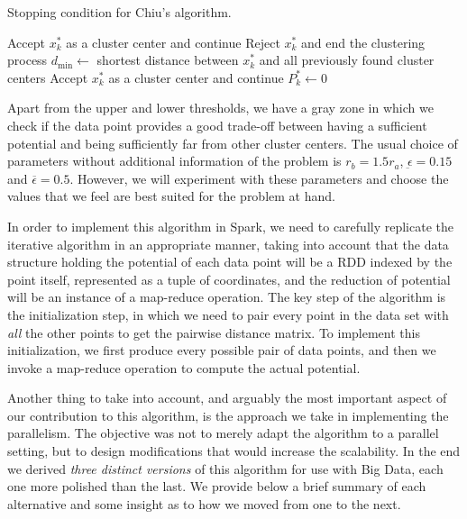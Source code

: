 \begin{algorithm}
  \caption{Stopping condition for Chiu's algorithm.}
    \label{alg:chiu1}
  \begin{algorithmic}
      \State Accept $x_k^\ast$ as a cluster center and continue
      \State Reject $x_k^\ast$ and end the clustering process
    \Else
      \State $d_{\text{min}}\gets$ shortest distance between $x_k^\ast$ and all previously found cluster centers
        \State Accept $x_k^\ast$ as a cluster center and continue
      \Else
        \State$P_k^\ast \gets 0$
      \EndIf
  \EndIf
  \end{algorithmic}
\end{algorithm}


Apart from the upper and lower thresholds, we have a gray zone in which we check if the data point provides a good trade-off between having a sufficient potential and being sufficiently far from other cluster centers. The usual choice of parameters without additional information of the problem is $r_b=1.5r_a$, $\underbar{\epsilon}=0.15$ and $\overbar{\epsilon}=0.5$. However, we will experiment with these parameters and choose the values that we feel are best suited for the problem at hand.

In order to implement this algorithm in Spark, we need to carefully replicate the iterative algorithm in an appropriate manner, taking into account that the data structure holding the potential of each data point will be a RDD indexed by the point itself, represented as a tuple of coordinates, and the reduction of potential will be an instance of a map-reduce operation. The key step of the algorithm is the initialization step, in which we need to pair every point in the data set with \textit{all} the other points to get the pairwise distance matrix. To implement this initialization, we first produce every possible pair of data points, and then we invoke a map-reduce operation to compute the actual potential.

Another thing to take into account, and arguably the most important aspect of our contribution to this algorithm, is the approach we take in implementing the parallelism. The objective was not to merely adapt the algorithm to a parallel setting, but to design modifications that would increase the scalability. In the end we derived \textit{three distinct versions} of this algorithm for use with Big Data, each one more polished than the last. We provide below a brief summary of each alternative and some insight as to how we moved from one to the next.


